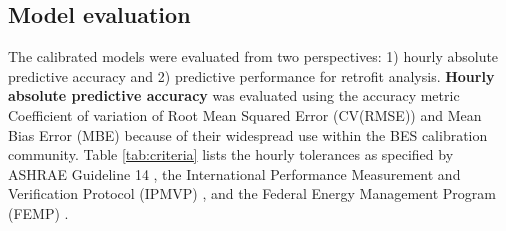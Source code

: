 \documentclass[3p,times,12pt]{elsarticle}
\begin{document}
\begin{sloppypar}
\subsection{Model evaluation}
\label{S:2.5}
The calibrated models were evaluated from two perspectives: 1) hourly absolute predictive accuracy and 2) predictive performance for retrofit analysis. 
\textbf{Hourly absolute predictive accuracy} was evaluated using the accuracy metric Coefficient of variation of Root Mean Squared Error (CV(RMSE)) and Mean Bias Error (MBE) because of their widespread use within the BES calibration community. Table \ref{tab:criteria} lists the hourly tolerances as specified by ASHRAE Guideline 14 \cite{guideline200214}, the International Performance Measurement and Verification Protocol (IPMVP) \cite{united2001international}, and the Federal Energy Management Program (FEMP) \cite{femp2015m}.

\begin{table}[H]
\centering
\scriptsize
\caption{Error limits specified by various guidelines and protocols serve as criteria for determining the calibration status of a building energy simulation model.}
\label{tab:criteria}
\end{table}


\end{sloppypar}
\end{document}

